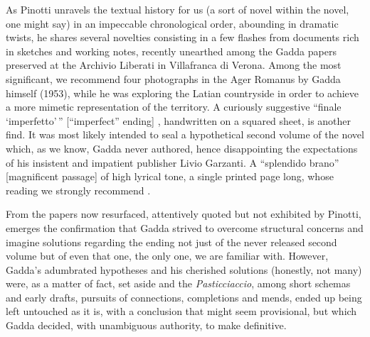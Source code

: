 \begin{review}
As Pinotti unravels the textual history for us (a sort of novel
within the novel, one might say) in an impeccable chronological order,
abounding in dramatic twists, he shares several novelties
consisting in a few flashes from documents rich in sketches and working
notes, recently unearthed among the Gadda papers preserved at the
Archivio Liberati in Villafranca di Verona. Among the most significant,
we recommend four photographs in the Ager Romanus by Gadda
himself (1953), while he was exploring the Latian countryside in order
to achieve a more mimetic representation of the territory. A
curiously suggestive ``finale `imperfetto'\,'' {[}``imperfect'' ending{]} \citep[322; quoting Gadda]{pinotti_nota_2018}, handwritten on a squared
sheet, is another find. It was most likely intended to seal a hypothetical second volume of the
novel which, as we know, Gadda never authored, hence disappointing the
expectations of his insistent and impatient publisher Livio Garzanti. A
``splendido brano'' {[}magnificent passage{]} of
high lyrical tone, a single printed page long, whose reading we strongly
recommend \citep[323]{pinotti_nota_2018}.

From the papers now resurfaced, attentively quoted but not exhibited by
Pinotti, emerges the confirmation that Gadda strived to
overcome structural concerns and imagine solutions regarding the ending
not just of the never released second volume but of even that one, the
only one, we are familiar with. However, Gadda's adumbrated hypotheses
and his cherished solutions (honestly, not many) were, as a matter of
fact, set aside and the \emph{Pasticciaccio}, among short schemas
and early drafts, pursuits of connections, completions and mends, ended
up being left untouched as it is, with a conclusion that might seem
provisional, but which Gadda decided, with unambiguous authority, to
make definitive.


\end{review}
